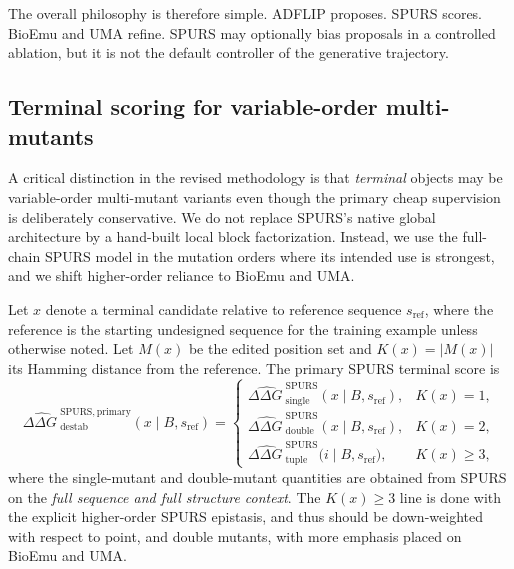 \documentclass[11pt]{article}
\newcommand{\ddG}{\ensuremath{\Delta\Delta G \ }}
\begin{document}
	The overall philosophy is therefore simple. ADFLIP proposes. SPURS scores. BioEmu and UMA refine. SPURS may optionally bias proposals in a controlled ablation, but it is not the default controller of the generative trajectory.
	
	
	
	\subsection{Terminal scoring for variable-order multi-mutants}
	
	A critical distinction in the revised methodology is that \emph{terminal} objects may be variable-order multi-mutant variants even though the primary cheap supervision is deliberately conservative. We do not replace SPURS's native global architecture by a hand-built local block factorization. Instead, we use the full-chain SPURS model in the mutation orders where its intended use is strongest, and we shift higher-order reliance to BioEmu and UMA.
	
	Let $x$ denote a terminal candidate relative to reference sequence $s_{\mathrm{ref}}$, where the reference is the starting undesigned sequence for the training example unless otherwise noted. Let $M(x)$ be the edited position set and $K(x)=|M(x)|$ its Hamming distance from the reference. The primary SPURS terminal score is
	\begin{equation}
		\label{eq:spursglobalprimary}
		\widehat{\ddG}^{\mathrm{SPURS,primary}}_{\mathrm{destab}}(x\mid B,s_{\mathrm{ref}})
		=
		\begin{cases}
			\widehat{\ddG}^{\mathrm{SPURS}}_{\mathrm{single}}(x\mid B,s_{\mathrm{ref}}), & K(x)=1,\\[4pt]
			\widehat{\ddG}^{\mathrm{SPURS}}_{\mathrm{double}}(x\mid B,s_{\mathrm{ref}}), & K(x)=2,\\[4pt]
			\widehat{\ddG}^{\mathrm{SPURS}}_{\mathrm{tuple}}\!\big(i\mid B,s_{\mathrm{ref}}\big), & K(x)\ge 3,
		\end{cases}
	\end{equation}
	where the single-mutant and double-mutant quantities are obtained from SPURS on the \emph{full sequence and full structure context}. The $K(x)\ge 3$ line is done with the explicit higher-order SPURS epistasis, and thus should be down-weighted with respect to point, and double mutants, with more emphasis placed on BioEmu and UMA. 
	
\end{document}
